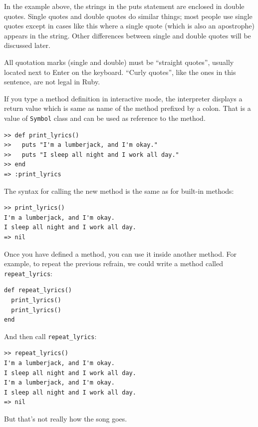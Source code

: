 \documentclass[10pt]{book}
\begin{document}
In the example above, the strings in the puts statement are enclosed in double
quotes.  Single quotes and double quotes do similar things;
most people use single quotes except in cases like this where
a single quote (which is also an apostrophe) appears in the string.
Other differences between single and double quotes will be discussed later.

All quotation marks (single and double)
must be ``straight quotes'', usually
located next to Enter on the keyboard.  ``Curly quotes'', like
the ones in this sentence, are not legal in Ruby.

If you type a method definition in interactive mode, the interpreter
displays a return value which is same as name of the
method prefixed by a colon.  That is a value of {\tt Symbol} class and
can be used as reference to the method.

\begin{verbatim}
>> def print_lyrics()
>>   puts "I'm a lumberjack, and I'm okay."
>>   puts "I sleep all night and I work all day."
>> end
=> :print_lyrics
\end{verbatim}
%

%
The syntax for calling the new method is the same as
for built-in methods:

\begin{verbatim}
>> print_lyrics()
I'm a lumberjack, and I'm okay.
I sleep all night and I work all day.
=> nil
\end{verbatim}
%
Once you have defined a method, you can use it inside another
method.  For example, to repeat the previous refrain, we could write
a method called \verb"repeat_lyrics":

\begin{verbatim}
def repeat_lyrics()
  print_lyrics()
  print_lyrics()
end
\end{verbatim}
%
And then call \verb"repeat_lyrics":

\begin{verbatim}
>> repeat_lyrics()
I'm a lumberjack, and I'm okay.
I sleep all night and I work all day.
I'm a lumberjack, and I'm okay.
I sleep all night and I work all day.
=> nil
\end{verbatim}
%
But that's not really how the song goes.
\end{document}
